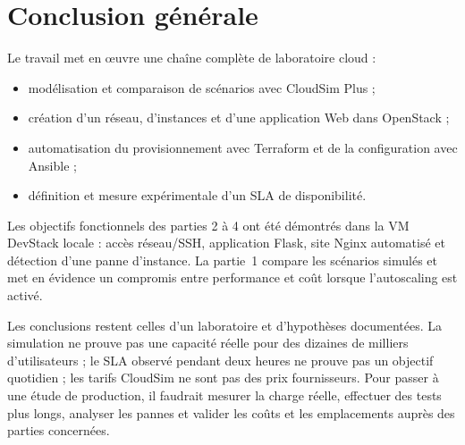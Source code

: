 \documentclass[11pt,a4paper]{article}
\begin{document}
\clearpage

\section*{Conclusion générale}

Le travail met en œuvre une chaîne complète de laboratoire cloud :
\begin{itemize}
  \item modélisation et comparaison de scénarios avec CloudSim Plus ;
  \item création d'un réseau, d'instances et d'une application Web dans OpenStack ;
  \item automatisation du provisionnement avec Terraform et de la configuration avec Ansible ;
  \item définition et mesure expérimentale d'un SLA de disponibilité.
\end{itemize}

Les objectifs fonctionnels des parties 2 à 4 ont été démontrés dans la VM DevStack locale : accès réseau/SSH, application Flask, site Nginx automatisé et détection d'une panne d'instance. La partie~1 compare les scénarios simulés et met en évidence un compromis entre performance et coût lorsque l'autoscaling est activé.

\begin{remarque}[Limites]
Les conclusions restent celles d'un laboratoire et d'hypothèses documentées. La simulation ne prouve pas une capacité réelle pour des dizaines de milliers d'utilisateurs ; le SLA observé pendant deux heures ne prouve pas un objectif quotidien ; les tarifs CloudSim ne sont pas des prix fournisseurs. Pour passer à une étude de production, il faudrait mesurer la charge réelle, effectuer des tests plus longs, analyser les pannes et valider les coûts et les emplacements auprès des parties concernées.
\end{remarque}
\end{document}
